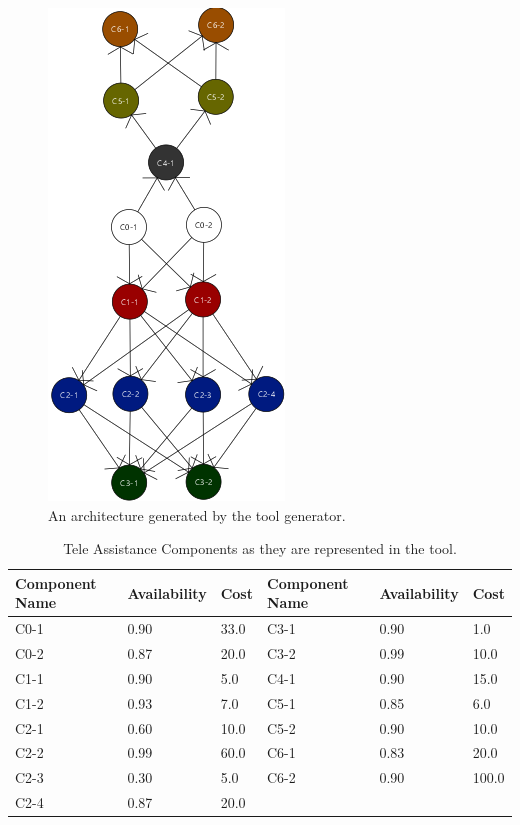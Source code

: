 \begin{figure}[ht]
	\centerline
	{\includegraphics[scale=0.9]{img/autogenerated_arch.png}}
	\caption[Generic Generated Architecture]{An architecture generated by the tool generator.}
	\label{fig:testarch}
\end{figure}

\begin{table}[ht!b]
	\centering
	\begin{tabular}{|p{2cm}|p{2cm}|p{1cm}||p{2cm}|p{2cm}|p{1cm}|}
		\hline 
		\textbf{Component Name} & \textbf{Availability} & \textbf{Cost} & \textbf{Component Name} & \textbf{Availability} & \textbf{Cost} \\ 
		\hline 
		C0-1 & 0.90 & 33.0 & C3-1 & 0.90 & 1.0 \\
		\hline 
		C0-2 & 0.87 & 20.0 & C3-2 & 0.99 & 10.0 \\ 
		\hline 
		C1-1 & 0.90 & 5.0 & C4-1 & 0.90 & 15.0 \\ 
		\hline 
		C1-2 & 0.93 & 7.0 & C5-1 & 0.85 & 6.0 \\ 
		\hline
		C2-1 & 0.60 & 10.0 & C5-2 & 0.90 & 10.0 \\ 
		\hline
		C2-2 & 0.99 & 60.0 & C6-1 & 0.83 & 20.0 \\ 
		\hline
		C2-3 & 0.30 & 5.0 & C6-2 & 0.90 & 100.0 \\ 
		\hline
		C2-4 & 0.87 & 20.0 & & & \\ 
		\hline
	\end{tabular} 
	\caption[TAS Components]{Tele Assistance Components as they are represented in the tool.}
	\label{tab:ag-comp}
\end{table}

